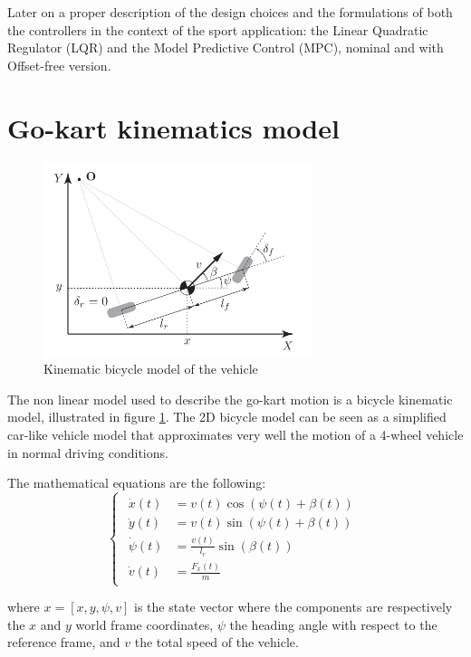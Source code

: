 \documentclass[a4paper,12pt,oneside]{book}
\begin{document}
Later on a proper description of the design choices and the formulations of both the controllers in the context of the sport application: the Linear Quadratic Regulator (LQR) and the Model Predictive Control (MPC), nominal and with Offset-free version.

\section{Go-kart kinematics model}
\begin{figure}[h!]
	\centering
	\includegraphics[width=0.7\textwidth]{Bycicle_scheme.png}
\caption{Kinematic bicycle model of the vehicle}
\label{Kinematic_bicycle}
\end{figure}
The non linear model used to describe the go-kart motion is a bicycle kinematic model, illustrated in figure \ref{Kinematic_bicycle}.
The 2D bicycle model can be seen as a simplified car-like vehicle model that approximates very well the motion of a 4-wheel vehicle in normal driving conditions.

The mathematical equations are the following:
\begin{equation}
\begin{cases}
 	\begin{aligned}
		\dot{x}(t) &= v(t) \cos(\psi(t) + \beta(t)) \\
		\dot{y}(t) &= v(t) \sin(\psi(t) + \beta(t)) \\
		\dot{\psi}(t) &= \frac{v(t)}{l_r} \sin(\beta(t)) \\
		\dot{v}(t) &= \frac{F_x(t)}{m} 
	\end{aligned}
\end{cases}
\label{Plant}
\end{equation}

where $x = [x, y, \psi, v]$ is the state vector where the components are respectively the $x$ and $y$ world frame coordinates, $\psi$ the heading angle with respect to the reference frame, and $v$ the total speed of the vehicle.
\end{document}
